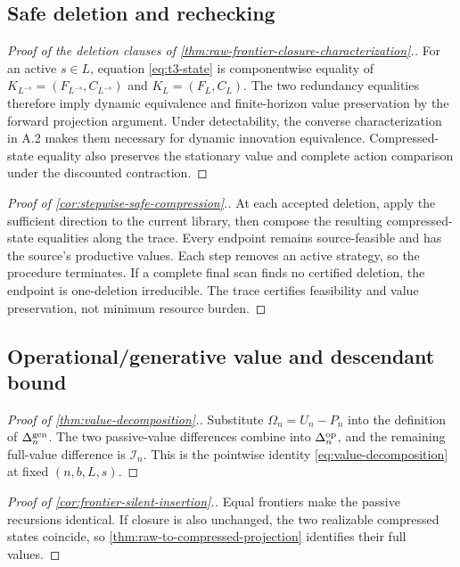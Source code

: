 \subsection{Safe deletion and rechecking}

\begin{proof}[Proof of the deletion clauses of
\cref{thm:raw-frontier-closure-characterization}.]
For an active \(s\in L\), equation \eqref{eq:t3-state} is componentwise
equality of
\(K_{L^{-s}}=(F_{L^{-s}},C_{L^{-s}})\) and
\(K_L=(F_L,C_L)\).  The two redundancy equalities therefore imply dynamic
equivalence and finite-horizon value preservation by the forward projection
argument.  Under detectability, the converse characterization in A.2 makes
them necessary for dynamic innovation equivalence.  Compressed-state equality
also preserves the stationary value and complete action comparison under the
discounted contraction.
\end{proof}

\begin{proof}[Proof of \cref{cor:stepwise-safe-compression}.]
At each accepted deletion, apply the sufficient direction to the current
library, then compose the resulting compressed-state equalities along the
trace.  Every endpoint remains source-feasible and has the source's productive
values.  Each step removes an active strategy, so the procedure terminates.
If a complete final scan finds no certified deletion, the endpoint is
one-deletion irreducible.  The trace certifies feasibility and value
preservation, not minimum resource burden.
\end{proof}

\subsection{Operational/generative value and descendant bound}
\label{app:proofs-value}

\begin{proof}[Proof of \cref{thm:value-decomposition}.]
Substitute \(\Omega_n=U_n-P_n\) into the definition of
\(\Delta_n^{\mathrm{gen}}\).  The two passive-value differences combine into
\(\Delta_n^{\mathrm{op}}\), and the remaining full-value difference is
\(\mathcal I_n\).  This is the pointwise identity
\eqref{eq:value-decomposition} at fixed \((n,b,L,s)\).
\end{proof}

\begin{proof}[Proof of \cref{cor:frontier-silent-insertion}.]
Equal frontiers make the passive recursions identical.  If closure is also
unchanged, the two realizable compressed states coincide, so
\cref{thm:raw-to-compressed-projection} identifies their full values.
\end{proof}

